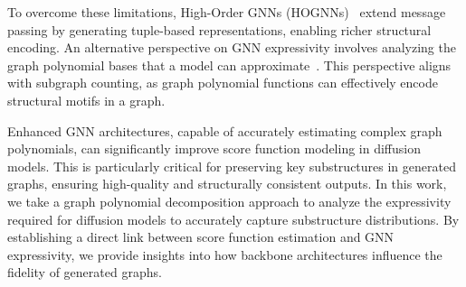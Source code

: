 To overcome these limitations, High-Order GNNs (HOGNNs)~\citep{NGNN, SSWL, PPGN} extend message passing by generating tuple-based representations, enabling richer structural encoding. An alternative perspective on GNN expressivity involves analyzing the graph polynomial bases that a model can approximate~\citep{GPoly}. This perspective aligns with subgraph counting, as graph polynomial functions can effectively encode structural motifs in a graph.  

Enhanced GNN architectures, capable of accurately estimating complex graph polynomials, can significantly improve score function modeling in diffusion models. This is particularly critical for preserving key substructures in generated graphs, ensuring high-quality and structurally consistent outputs. In this work, we take a graph polynomial decomposition approach to analyze the expressivity required for diffusion models to accurately capture substructure distributions. By establishing a direct link between score function estimation and GNN expressivity, we provide insights into how backbone architectures influence the fidelity of generated graphs.